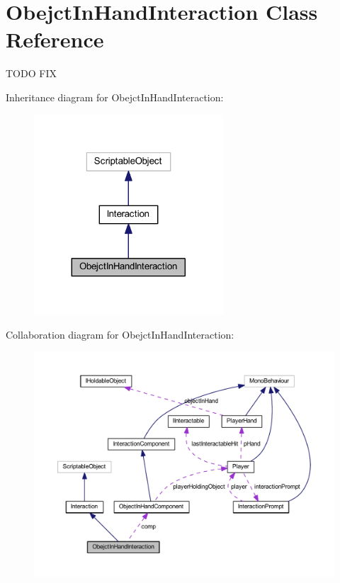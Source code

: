 \hypertarget{class_obejct_in_hand_interaction}{}\section{Obejct\+In\+Hand\+Interaction Class Reference}
\label{class_obejct_in_hand_interaction}


T\+O\+DO F\+IX  




Inheritance diagram for Obejct\+In\+Hand\+Interaction\+:
\nopagebreak
\begin{figure}[H]
\begin{center}
\leavevmode
\includegraphics[width=200pt]{class_obejct_in_hand_interaction__inherit__graph}
\end{center}
\end{figure}


Collaboration diagram for Obejct\+In\+Hand\+Interaction\+:
\nopagebreak
\begin{figure}[H]
\begin{center}
\leavevmode
\includegraphics[width=350pt]{class_obejct_in_hand_interaction__coll__graph}
\end{center}
\end{figure}

